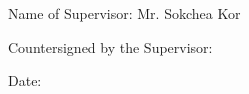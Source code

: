 \begin{adjustwidth}{0.2cm}{0.2cm}
    \vspace{1cm}
    \setlength{\parindent}{0pt}
    {\large Name of Supervisor: Mr. Sokchea Kor\par}
    
    \vspace{0.5cm}
    \setlength{\parindent}{0pt}
    {\large Countersigned by the Supervisor: \dotfill\par}
    
    \vspace{0.5cm}
    \setlength{\parindent}{0pt}
    {\large Date: \dotfill\par}

    
\end{adjustwidth}
